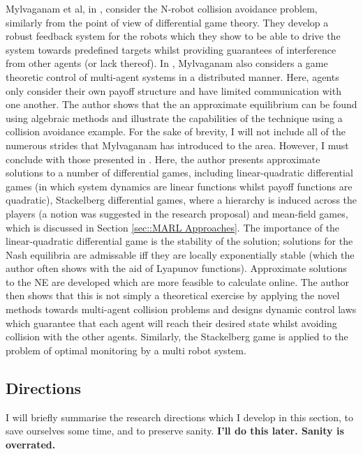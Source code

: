 \documentclass[preprint,11pt]{report}
\begin{document}
 Mylvaganam et al, in \cite{Mylvaganam2017AutonomousApproach}, consider the N-robot collision
 avoidance problem, similarly from the point of view of differential game theory. They develop a
 robust feedback system for the robots which they show to be able to drive the system towards
 predefined targets whilst providing guarantees of interference from other agents (or lack thereof).
 In \cite{MylvaganamASystems}, Mylvaganam also considers a game theoretic control of multi-agent
 systems in a distributed manner. Here, agents only consider their own payoff structure and have
 limited communication with one another. The author shows that the an approximate equilibrium can be
 found using algebraic methods and illustrate the capabilities of the technique using a collision
 avoidance example. For the sake of brevity, I will not include all of the numerous strides that
 Mylvaganam has introduced to the area. However, I must conclude with those presented in
 \cite{Mylvaganam2014}. Here, the author presents approximate solutions to a number of differential
 games, including linear-quadratic differential games (in which system dynamics are linear functions
 whilst payoff functions are quadratic), Stackelberg differential games, where a hierarchy is
 induced across the players (a notion was suggested in the research proposal) and mean-field games,
 which is discussed in Section \ref{sec::MARL Approaches}. The importance of the linear-quadratic
 differential game is the stability of the solution; solutions for the Nash equilibria are
 admissable iff they are locally exponentially stable (which the author often shows with the aid of
 Lyapunov functions). Approximate solutions to the NE are developed which are more feasible to
 calculate online. The author then shows that this is not simply a theoretical exercise by applying
 the novel methods towards multi-agent collision problems and designs dynamic control laws which
 guarantee that each agent will reach their desired state whilst avoiding collision with the other
 agents. Similarly, the Stackelberg game is applied to the problem of optimal monitoring by a multi
 robot system. 

\subsection{Directions}


I will briefly summarise the research directions which I develop in this section, to save ourselves
some time, and to preserve sanity. \textbf{I'll do this later. Sanity is overrated.}
\end{document}
